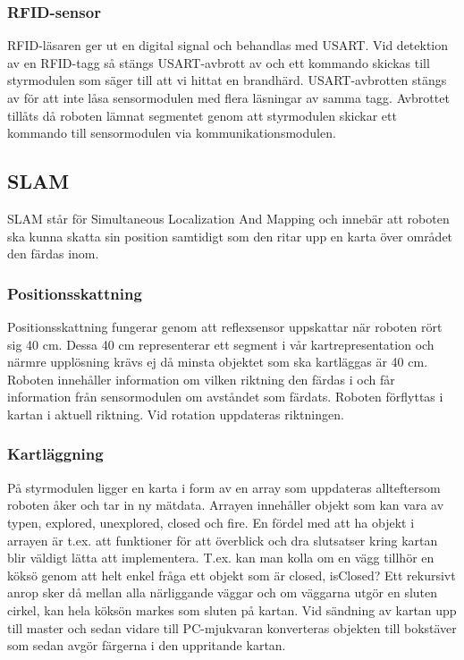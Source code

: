 \documentclass[a4paper,12pt,fleqn]{article}
\begin{document}
\subsubsection{RFID-sensor}

RFID-läsaren ger ut en digital signal och behandlas med USART. Vid detektion av en RFID-tagg så stängs USART-avbrott av och ett kommando skickas till styrmodulen som säger till att vi hittat en brandhärd. 
USART-avbrotten stängs av för att inte låsa sensormodulen med flera läsningar av samma tagg. Avbrottet tillåts då roboten lämnat segmentet genom att styrmodulen skickar ett kommando till sensormodulen via kommunikationsmodulen.

\subsection{SLAM}

SLAM står för Simultaneous Localization And Mapping och innebär att roboten ska kunna skatta sin position samtidigt som den ritar upp en karta över området den färdas inom.

\subsubsection{Positionsskattning}
Positionsskattning fungerar genom att reflexsensor uppskattar när roboten rört sig 40 cm. Dessa 40 cm representerar ett segment i vår kartrepresentation och närmre upplösning krävs ej då minsta objektet som ska kartläggas är 40 cm. Roboten innehåller information om vilken riktning den färdas i och får information från sensormodulen om avståndet som färdats. Roboten förflyttas i kartan i aktuell riktning. Vid rotation uppdateras riktningen. 

\subsubsection{Kartläggning}
På styrmodulen ligger en karta i form av en array som uppdateras allteftersom roboten åker och tar in ny mätdata. Arrayen innehåller objekt som kan vara av typen, explored, unexplored, closed och fire. En fördel med att ha objekt i arrayen är t.ex. att funktioner för att överblick och dra slutsatser kring kartan blir väldigt lätta att implementera. T.ex. kan man kolla om en vägg tillhör en köksö genom att helt enkel fråga ett objekt som är closed, isClosed? Ett rekursivt anrop sker då mellan alla närliggande väggar och om väggarna utgör en sluten cirkel, kan hela köksön markes som sluten på kartan. 
Vid sändning av kartan upp till master och sedan vidare till PC-mjukvaran konverteras objekten till bokstäver som sedan avgör färgerna i den uppritande kartan.
\end{document}
